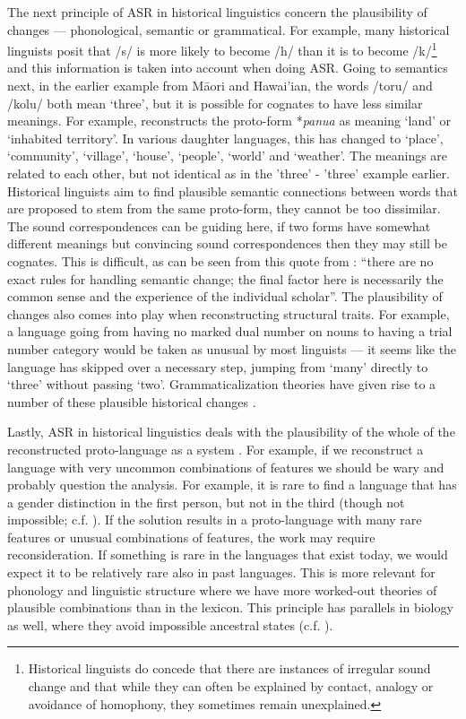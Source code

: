 \documentclass[12pt,letterpaper]{article}
\begin{document}
The next principle of ASR in historical linguistics concern the plausibility of changes --- phonological, semantic or grammatical. For example, many historical linguists posit that /s/ is more likely to become /h/ than it is to become /k/\footnote{Historical linguists do concede that there are instances of irregular sound change \citep{blust1996neogrammarian, campbell1996sound} and that while they can often be explained by contact, analogy or avoidance of homophony, they sometimes remain unexplained.} and this information is taken into account when doing ASR. Going to semantics next, in the earlier example from M\={a}ori and Hawai'ian, the words /toru/ and /kolu/ both mean `three', but it is possible for cognates to have less similar meanings. For example, \citet{pawley2005meaning} reconstructs the proto-form *\emph{panua} as meaning `land' or `inhabited territory'. In various daughter languages, this has changed to `place', `community', `village', `house', `people', `world' and `weather'. The meanings are related to each other, but not identical as in the 'three' - 'three' example earlier. Historical linguists aim to find plausible semantic connections between words that are proposed to stem from the same proto-form, they cannot be too dissimilar. The sound correspondences can be guiding here, if two forms have somewhat different meanings but convincing sound correspondences then they may still be cognates. This is difficult, as can be seen from this quote from \citet[229]{anttila1989historical}: ``there are no exact rules for handling semantic change; the final factor here is necessarily the common sense and the experience of the individual scholar''. The plausibility of changes also comes into play when reconstructing structural traits. For example, a language going from having no marked dual number on nouns to having a trial number category would be taken as unusual by most linguists \citep[c.f.][8]{kikusawa_2006_pro_number} --- it seems like the language has skipped over a necessary step, jumping from `many' directly to `three' without passing `two'. Grammaticalization theories have given rise to a number of these plausible historical changes \citep[594-5, 598]{heine2003grammaticalization}.

Lastly, ASR in historical linguistics deals with the plausibility of the whole of the reconstructed proto-language as a system \citep[1]{clark1973aspects}. For example, if we reconstruct a language with very uncommon combinations of features we should be wary and probably question the analysis. For example, it is rare to find a language that has a gender distinction in the first person, but not in the third (though not impossible; c.f. \citet{wals-44}). If the solution results in a proto-language with many rare features or unusual combinations of features, the work may require reconsideration. If something is rare in the languages that exist today, we would expect it to be relatively rare also in past languages. This is more relevant for phonology and linguistic structure where we have more worked-out theories of plausible combinations than in the lexicon. This principle has parallels in biology as well, where they avoid impossible ancestral states (c.f. \citep{schulmeister2004comparative}).
\end{document}

